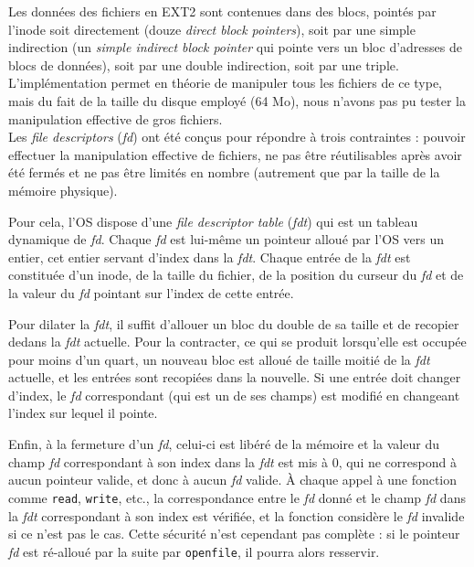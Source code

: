 \documentclass[a4paper, 10pt, french]{article}
\newcommand{\foreign}[1]{\emph{#1}}
\begin{document}
		Les données des fichiers en EXT2 sont contenues dans des blocs, 
pointés par l'inode soit directement (douze \foreign{direct block pointers}), 
soit par une simple indirection (un \foreign{simple indirect block pointer} qui 
pointe vers un bloc d'adresses de blocs de données), soit par une double 
indirection, soit par une triple. L'implémentation permet en théorie de 
manipuler tous les fichiers de ce type, mais du fait de la taille du disque 
employé (64 Mo), nous n'avons pas pu tester la manipulation effective de gros 
fichiers.\\
		
		Les \foreign{file descriptors} (\foreign{fd}) ont été conçus 
pour répondre à trois contraintes : pouvoir effectuer la manipulation effective 
de fichiers, ne pas être réutilisables après avoir été fermés et ne pas être 
limités en nombre (autrement que par la taille de la mémoire physique). 
		
		Pour cela, l'OS dispose d'une \foreign{file descriptor table} 
(\foreign{fdt}) qui est un tableau dynamique de \foreign{fd}. Chaque 
\foreign{fd} est lui-même un pointeur alloué par l'OS vers un entier, cet entier 
servant d'index dans la \foreign{fdt}. Chaque entrée de la \foreign{fdt} est 
constituée d'un inode, de la taille du fichier, de la position du curseur du 
\foreign{fd} et de la valeur du \foreign{fd} pointant sur l'index de cette 
entrée.
		
		Pour dilater la \foreign{fdt}, il suffit d'allouer un bloc du 
double de sa taille et de recopier dedans la \foreign{fdt} actuelle. Pour la 
contracter, ce qui se produit lorsqu'elle est occupée pour moins d'un quart, un 
nouveau bloc est alloué de taille moitié de la \foreign{fdt} actuelle, et les 
entrées sont recopiées dans la nouvelle. Si une entrée doit changer d'index, le 
\foreign{fd} correspondant (qui est un de ses champs) est modifié en changeant 
l'index sur lequel il pointe.
		
		Enfin, à la fermeture d'un \foreign{fd}, celui-ci est libéré de 
la mémoire et la valeur du champ \foreign{fd} correspondant à son index dans la 
\foreign{fdt} est mis à 0, qui ne correspond à aucun pointeur valide, et donc à 
aucun \foreign{fd} valide. À chaque appel à une fonction comme \verb|read|, 
\verb|write|, etc., la correspondance entre le \foreign{fd} donné et le champ 
\foreign{fd} dans la \foreign{fdt} correspondant à son index est vérifiée, et la 
fonction considère le \foreign{fd} invalide si ce n'est pas le cas. Cette 
sécurité n'est cependant pas complète : si le pointeur \foreign{fd} est 
ré-alloué par la suite par \verb|openfile|, il pourra alors resservir.
\end{document}
